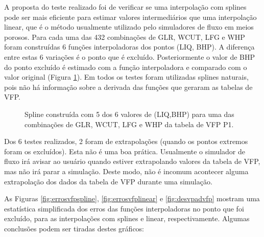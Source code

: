 \documentclass[final,5p]{elsarticle}
\numberwithin{equation}{section}
\begin{document}
        A proposta do teste realizado foi de verificar se uma interpolação com splines pode ser mais eficiente para estimar valores intermediários que uma interpolação linear, que é o método usualmente utilizado pelo simuladores de fluxo em meios porosos. Para cada uma das 432 combinações de GLR, WCUT, LFG e WHP foram construídas 6 funções interpoladoras dos pontos (LIQ, BHP). A diferença entre estas 6 variações é o ponto que é excluído. Posteriormente o valor de BHP do ponto excluído é estimado com a função interpoladora e comparado com o valor original (Figura \ref{fig:exvfp}). Em todos os testes foram utilizadas splines naturais, pois não há informação sobre a derivada das funções que geraram as tabelas de VFP. 

        \begin{figure}[hbt!] 
            \caption{Spline construída com 5 dos 6 valores de (LIQ,BHP) para uma das combinações de GLR, WCUT, LFG e WHP da tabela de VFP P1.}
            \label{fig:exvfp}
        \end{figure}
                
        Dos 6 testes realizados, 2 foram de extrapolações (quando os pontos extremos foram os excluídos). Esta não é uma boa prática. Usualmente o simulador de fluxo irá avisar ao usuário quando estiver extrapolando valores da tabela de VFP, mas não irá parar a simulação. Deste modo, não é incomum acontecer alguma extrapolação dos dados da tabela de VFP durante uma simulação.
        
        As Figuras \ref{fig:errosvfpspline}, \ref{fig:errosvfplinear} e \ref{fig:desvpadvfp} mostram uma estatística simplificada dos erros das funções interpoladoras no ponto que foi excluído, para as interpolações com splines e linear, respectivamente. Algumas conclusões podem ser tiradas destes gráficos:
\end{document}

